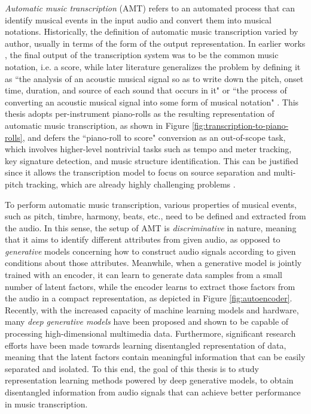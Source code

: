 \emph{Automatic music transcription} (AMT) refers to an automated process that can identify musical events in the input audio and convert them into musical notations.
Historically, the definition of automatic music transcription varied by author, usually in terms of the form of the output representation.
In earlier works \cite{moorer1977transcription,piszczalski1977transcription}, the final output of the transcription system was to be the common music notation, i.e. a score, while later literature generalizes the problem by defining it as ``the analysis of an acoustic musical signal so as to write down the pitch, onset time, duration, and source of each sound that occurs in it" \cite{klapuri2006transcription} or ``the process of converting an acoustic musical signal into some form of musical notation" \cite{benetos2013amt}.
This thesis adopts per-instrument piano-rolls as the resulting representation of automatic music transcription, as shown in Figure \ref{fig:transcription-to-piano-rolls}, and defers the ``piano-roll to score" conversion as an out-of-scope task, which involves higher-level nontrivial tasks such as tempo and meter tracking, key signature detection, and music structure identification.
This can be justified since it allows the transcription model to focus on source separation and multi-pitch tracking, which are already highly challenging problems \cite{cemgil2006generative}.


To perform automatic music transcription, various properties of musical events, such as pitch, timbre, harmony, beats, etc., need to be defined and extracted from the audio.
In this sense, the setup of AMT is \emph{discriminative} in nature, meaning that it aims to identify different attributes from given audio, as opposed to \emph{generative} models concerning how to construct audio signals according to given conditions about those attributes.
Meanwhile, when a generative model is jointly trained with an encoder, it can learn to generate data samples from a small number of latent factors, while the encoder learns to extract those factors from the audio in a compact representation, as depicted in Figure \ref{fig:autoencoder}.
Recently, with the increased capacity of machine learning models and hardware, many \emph{deep generative models} have been proposed and shown to be capable of processing high-dimensional multimedia data.
Furthermore, significant research efforts have been made towards learning disentangled representation of data, meaning that the latent factors contain meaningful information that can be easily separated and isolated.
To this end, the goal of this thesis is to study representation learning methods powered by deep generative models, to obtain disentangled information from audio signals that can achieve better performance in music transcription.

